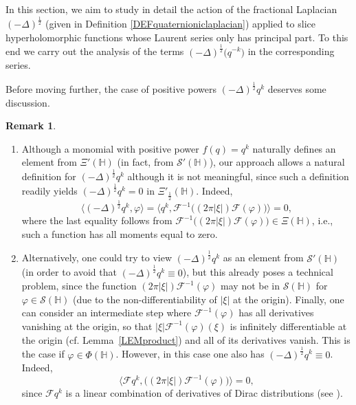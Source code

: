 \documentclass[reqno,11pt]{amsart}
\theoremstyle{definition}
\newtheorem{remark}[theorem]{Remark}
\begin{document}
In this section, we aim to study in detail the action of the fractional Laplacian $(-\Delta)^{\frac{1}{2}}$ (given in Definition \ref{DEFquaternioniclaplacian}) applied to slice hyperholomorphic functions whose Laurent series only has principal part. To this end we carry out the analysis of the terms $(-\Delta)^{\frac{1}{2}}\big(q^{-k}\big)$ in the corresponding series.


Before moving further, the case of positive powers $(-\Delta)^\frac{1}{2}q^k$ deserves some discussion.


\begin{remark}\label{REMdiscussion}
	\begin{enumerate}[wide,label=\textnormal{(\roman{*})}]
\item  Although a monomial with positive power $f(q)=q^{k}$ naturally defines an element from $\Xi'(\mathbb{H})$  (in fact, from $\mathcal{S}'(\mathbb{H})$), our approach allows a natural definition for  $(-\Delta)^{\frac{1}{2}}q^{k}$ although it is not meaningful, since such a definition readily yields $(-\Delta)^{\frac{1}{2}}q^{k}=0$ in $\Xi'_{\frac{1}{2}}(\mathbb{H})$. Indeed,
\begin{equation}
	\langle (-\Delta)^{\frac{1}{2}} q^{k}, \varphi \rangle = \langle q^{k}, \mathcal{F}^{-1}\big( (2 \pi  |\xi|) \mathcal{F}(\varphi) \big)\rangle=0,
\end{equation}
where the last equality follows from $\mathcal{F}^{-1}\big( (2 \pi  |\xi|) \mathcal{F}(\varphi) \big)\in \Xi(\mathbb{H})$, i.e.,  such a function has all moments equal to zero.

\item  Alternatively, one could try to view $(-\Delta)^{\frac{1}{2}}q^{k}$ as an element from $\mathcal{S}'(\mathbb{H})$ (in order to avoid that $(-\Delta)^{\frac{1}{2}} q^{k}\equiv 0$), but this already poses a technical problem, since the function $(2\pi  |\xi|)\mathcal{F}^{-1}(\varphi)$ may not be in $\mathcal{S}(\mathbb{H})$ for $\varphi\in \mathcal{S}(\mathbb{H})$ (due to the non-differentiability of $|\xi|$ at the origin).
Finally, one can consider an intermediate step where $\mathcal{F}^{-1}(\varphi)$ has all derivatives vanishing at the origin, so that $|\xi|\mathcal{F}^{-1}(\varphi)(\xi)$ is infinitely differentiable at the origin (cf. Lemma~\ref{LEMproduct}) and all of its derivatives vanish. This is the case if $\varphi\in \Phi(\mathbb{H})$. However, in this case one also has $(-\Delta)^{\frac{1}{2}} q^{k}\equiv 0$. Indeed,
\[
\langle \mathcal{F} q^{k}, \big( (2 \pi  |\xi|) \mathcal{F}^{-1}(\varphi) \big)\rangle=0,
\]
since $\mathcal{F}q^k$ is a linear combination of derivatives of Dirac distributions (see \cite{DQ}).
\end{enumerate}
\end{remark}
\end{document}
